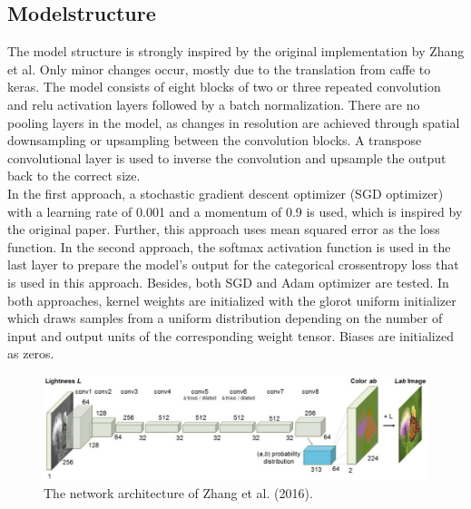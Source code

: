 \documentclass[12pt,letterpaper]{article}
\begin{document}
\subsection{Modelstructure}
The model structure is strongly inspired by the original implementation by Zhang et al. Only minor changes occur, mostly due to the translation from caffe to keras. The model consists of eight blocks of two or three repeated convolution and relu activation layers followed by a batch normalization. There are no pooling layers in the model, as changes  in  resolution  are  achieved  through  spatial  downsampling  or  upsampling between the convolution blocks. A transpose convolutional layer is used to inverse the convolution and upsample the output back to the correct size.\\
In the first approach, a stochastic gradient descent optimizer (SGD optimizer) with a learning rate of 0.001 and a momentum of 0.9 is used, which is inspired by the original paper. Further, this approach uses mean squared error as the loss function. In the second approach, the softmax activation function is used in the last layer to prepare the model's output for the categorical crossentropy loss that is used in this approach. Besides, both SGD and Adam optimizer are tested. In both approaches, kernel weights are initialized with the glorot uniform initializer which draws samples from a uniform distribution depending on the number of input and output units of the corresponding weight tensor. Biases are initialized as zeros.\\
\begin{figure}[ht]
	\centering
	\includegraphics[width=1.0\textwidth]{layer.png}
	\caption{The network architecture of Zhang et al. (2016). }
	\label{network}
\end{figure}
\end{document}
